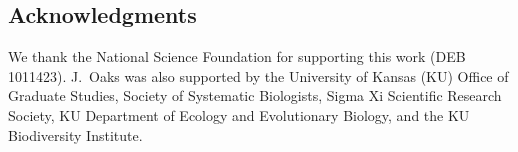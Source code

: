 \documentclass[letterpaper,12pt]{article}
\begin{document}
\begin{linenumbers}
\section*{Acknowledgments}
We thank the National Science Foundation for supporting this work (DEB
1011423).
J.\ Oaks was also supported by the University of Kansas (KU) Office of Graduate
Studies, Society of Systematic Biologists, Sigma Xi Scientific Research
Society, KU Department of Ecology and Evolutionary Biology, and the KU
Biodiversity Institute.


% 

\newpage
\singlespacing

\renewcommand\listfigurename{Figure Captions}
\renewcommand\cftdotsep{\cftnodots}
\setlength\cftbeforefigskip{10pt}
\listoffigures


\end{linenumbers}

\newpage
\singlespacing
\end{document}
